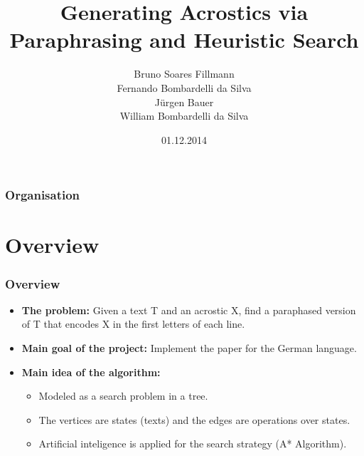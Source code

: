 \documentclass{beamer}
\title[Generating Acrostics via Paraphrasing and Heuristic Search]{Generating Acrostics via Paraphrasing and Heuristic Search} %
\author[Bruno, Fernando, Jürgen, William]{Bruno Soares Fillmann\\
Fernando Bombardelli da Silva\\
Jürgen Bauer\\
William Bombardelli da Silva
} %
\institute[TU Berlin] %
{
Technische Universität Berlin \\ %
Datenbanksysteme und Informationsmanagement \\
DBPRO – Database Projects (WS 2014/2015) \\
\medskip
}
\date{01.12.2014} %
\begin{document}
\begin{frame}
\titlepage %
\end{frame}

\begin{frame}
\frametitle{Organisation} %
\tableofcontents %
\end{frame}


\section{Overview} %


\begin{frame}
\frametitle{Overview}
\begin{itemize}
\item \textbf{The problem:} Given a text T and an acrostic X, find a paraphased version of T that encodes X in the first letters of each line.
\item \textbf{Main goal of the project:} Implement the paper for the German language.
\item \textbf{Main idea of the algorithm:}
	\begin{itemize}
	\item Modeled as a search problem in a tree.
	\item The vertices are states (texts) and the edges are operations over states.
	\item Artificial inteligence is applied for the search strategy (A* Algorithm).
	\end{itemize}
\end{itemize}
\end{frame}
\end{document}
